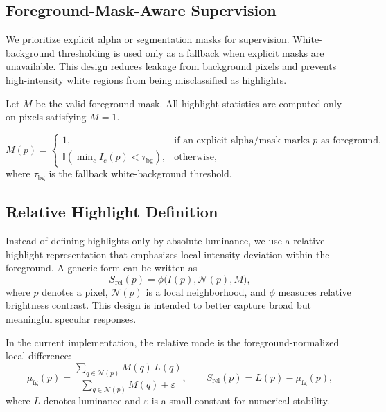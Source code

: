\documentclass[UTF8,a4paper]{ctexart}
\begin{document}
\subsection{Foreground-Mask-Aware Supervision}

We prioritize explicit alpha or segmentation masks for supervision. White-background thresholding is used only as a fallback when explicit masks are unavailable. This design reduces leakage from background pixels and prevents high-intensity white regions from being misclassified as highlights.

Let $M$ be the valid foreground mask. All highlight statistics are computed only on pixels satisfying $M=1$.

\begin{equation}
M(p)=
\begin{cases}
1, & \text{if an explicit alpha/mask marks } p \text{ as foreground},\\
\mathbb{I}\!\left(\min\nolimits_c I_c(p) < \tau_{\text{bg}}\right), & \text{otherwise},
\end{cases}
\end{equation}
where $\tau_{\text{bg}}$ is the fallback white-background threshold.

\subsection{Relative Highlight Definition}

Instead of defining highlights only by absolute luminance, we use a relative highlight representation that emphasizes local intensity deviation within the foreground. A generic form can be written as
\begin{equation}
S_{\text{rel}}(p) = \phi\big(I(p), \mathcal{N}(p), M\big),
\end{equation}
where $p$ denotes a pixel, $\mathcal{N}(p)$ is a local neighborhood, and $\phi$ measures relative brightness contrast. This design is intended to better capture broad but meaningful specular responses.

In the current implementation, the relative mode is the foreground-normalized local difference:
\begin{equation}
\mu_{\text{fg}}(p)=
\frac{\sum_{q \in \mathcal{N}(p)} M(q)\,L(q)}
{\sum_{q \in \mathcal{N}(p)} M(q)+\varepsilon},
\qquad
S_{\text{rel}}(p)=L(p)-\mu_{\text{fg}}(p),
\end{equation}
where $L$ denotes luminance and $\varepsilon$ is a small constant for numerical stability.
\end{document}
